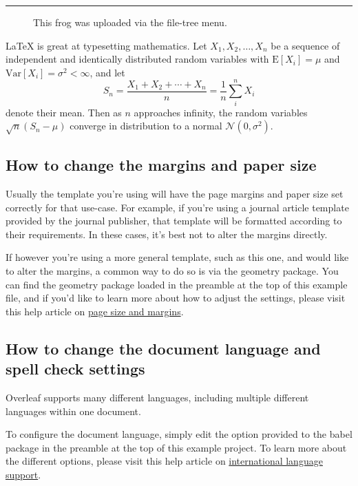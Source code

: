 \documentclass{article}
\begin{document}
\vspace{10pt} %
\hrule


\begin{figure}
   \centering
   \caption{\label{fig:frog}This frog was uploaded via the file-tree menu.}
   \end{figure}








\LaTeX{} is great at typesetting mathematics. Let $X_1, X_2, \ldots, X_n$ be a sequence of independent and identically distributed random variables with $\text{E}[X_i] = \mu$ and $\text{Var}[X_i] = \sigma^2 < \infty$, and let
\[S_n = \frac{X_1 + X_2 + \cdots + X_n}{n}
      = \frac{1}{n}\sum_{i}^{n} X_i\]
denote their mean. Then as $n$ approaches infinity, the random variables $\sqrt{n}(S_n - \mu)$ converge in distribution to a normal $\mathcal{N}(0, \sigma^2)$.


\subsection{How to change the margins and paper size}

Usually the template you're using will have 
the page margins and paper size set correctly for that use-case. For example, if you're using a journal article template provided by the journal publisher, that template will be formatted according to their requirements. In these cases, it's best not to alter the margins directly.

If however you're using a more general template, such as this one, and would like to alter the margins, a common way to do so is via the geometry package. You can find the geometry package loaded in the preamble at the top of this example file, and if you'd like to learn more about how to adjust the settings, please visit this help article on \href{https://www.overleaf.com/learn/latex/page_size_and_margins}{page size and margins}.

\subsection{How to change the document language and spell check settings}

Overleaf supports many different languages, including multiple different languages within one document. 

To configure the document language, simply edit the option provided to the babel package in the preamble at the top of this example project. To learn more about the different options, please visit this help article on \href{https://www.overleaf.com/learn/latex/International_language_support}{international language support}.
\end{document}
